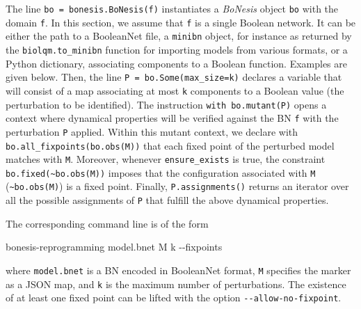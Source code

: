 \documentclass[PCJ,Unicode,screen,mode=plain]{cedram}
\newenvironment{Shaded}{}{}
\newcommand{\NormalTok}[1]{{#1}}
\newcommand{\ExtensionTok}[1]{{#1}}
\newcommand{\AttributeTok}[1]{\textcolor[rgb]{0.49,0.56,0.16}{{#1}}}
\begin{document}
The line \texttt{bo\ =\ bonesis.BoNesis(f)} instantiates a
\emph{BoNesis} object \texttt{bo} with the domain \texttt{f}. In this
section, we assume that \texttt{f} is a single Boolean network. It can
be either the path to a BooleanNet file, a \texttt{minibn} object, for
instance as returned by the \texttt{biolqm.to\_minibn} function for
importing models from various formats, or a Python dictionary,
associating components to a Boolean function. Examples are given below.
Then, the line \texttt{P\ =\ bo.Some(max\_size=k)} declares a variable
that will consist of a map associating at most \texttt{k} components to
a Boolean value (the perturbation to be identified). The instruction
\texttt{with\ bo.mutant(P)} opens a context where dynamical properties
will be verified against the BN \texttt{f} with the perturbation
\texttt{P} applied. Within this mutant context, we declare with
\texttt{bo.all\_fixpoints(bo.obs(M))} that each fixed point of the
perturbed model matches with \texttt{M}. Moreover, whenever
\texttt{ensure\_exists} is true, the constraint
\texttt{bo.fixed(\textasciitilde{}bo.obs(M))} imposes that the
configuration associated with \texttt{M}
(\texttt{\textasciitilde{}bo.obs(M)}) is a fixed point. Finally,
\texttt{P.assignments()} returns an iterator over all the possible
assignments of \texttt{P} that fulfill the above dynamical properties.

The corresponding command line is of the form

\begin{Shaded}
\begin{Highlighting}[]
\ExtensionTok{bonesis{-}reprogramming}\NormalTok{ model.bnet M k }\AttributeTok{{-}{-}fixpoints}
\end{Highlighting}
\end{Shaded}

where \texttt{model.bnet} is a BN encoded in BooleanNet format,
\texttt{M} specifies the marker as a JSON map, and \texttt{k} is the
maximum number of perturbations. The existence of at least one fixed
point can be lifted with the option \texttt{-\/-allow-no-fixpoint}.
\end{document}
